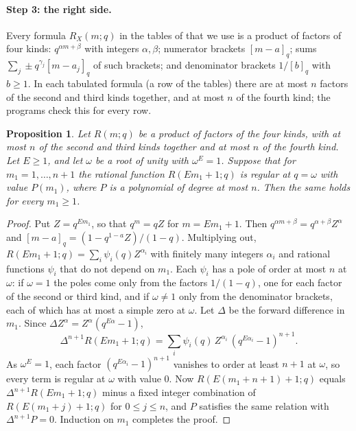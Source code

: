 \documentclass[11pt]{article}
\newtheorem{proposition}[theorem]{Proposition}
\theoremstyle{definition}
\begin{document}
\paragraph{Step 3: the right side.}
Every formula $R_X(m;q)$ in the tables of \cite[\S3.6]{RS} that we use is a
product of factors of four kinds: $q^{\alpha m+\beta}$ with integers
$\alpha,\beta$; numerator brackets $[m-a]_q$; sums
$\sum_j\pm q^{\gamma_j}[m-a_j]_q$ of such brackets; and denominator brackets
$1/[b]_q$ with $b\ge1$. In each tabulated formula (a row of the tables)
there are at most $n$ factors of the second and third kinds together,
and at most $n$ of the fourth kind; the programs check this for every row.

\begin{proposition}\label{prop:rhs}
Let $R(m;q)$ be a product of factors of the four kinds, with at most $n$
of the second and third kinds together and at most $n$ of the fourth kind.
Let $E\ge1$, and let $\omega$ be a root of unity with
$\omega^E=1$. Suppose that for $m_1=1,\dots,n+1$ the rational function
$R(Em_1+1;q)$ is regular at $q=\omega$ with value $P(m_1)$, where $P$ is a
polynomial of degree at most $n$. Then the same holds for every $m_1\ge1$.
\end{proposition}

\begin{proof}
Put $Z=q^{Em_1}$, so that $q^m=qZ$ for $m=Em_1+1$. Then
$q^{\alpha m+\beta}=q^{\alpha+\beta}Z^\alpha$ and
$[m-a]_q=(1-q^{1-a}Z)/(1-q)$. Multiplying out,
$R(Em_1+1;q)=\sum_i\psi_i(q)Z^{\alpha_i}$ with finitely many integers
$\alpha_i$ and rational functions $\psi_i$ that do not depend on $m_1$.
Each $\psi_i$ has a pole of order at most $n$ at $\omega$: if $\omega=1$
the poles come only from the factors $1/(1-q)$, one for each factor of the
second or third kind, and if $\omega\ne1$ only from the denominator brackets,
each of which has at most a simple zero at $\omega$. Let $\Delta$ be the
forward difference in $m_1$. Since $\Delta Z^\alpha=Z^\alpha(q^{E\alpha}-1)$,
\[
\Delta^{n+1}R(Em_1+1;q)=\sum_i\psi_i(q)\,Z^{\alpha_i}\,(q^{E\alpha_i}-1)^{n+1}.
\]
As $\omega^E=1$, each factor $(q^{E\alpha_i}-1)^{n+1}$ vanishes to order at
least $n+1$ at $\omega$, so every term is regular at $\omega$ with value $0$.
Now $R(E(m_1+n+1)+1;q)$ equals $\Delta^{n+1}R(Em_1+1;q)$ minus a fixed
integer combination of $R(E(m_1+j)+1;q)$ for $0\le j\le n$, and $P$ satisfies
the same relation with $\Delta^{n+1}P=0$. Induction on $m_1$ completes the
proof.
\end{proof}
\end{document}
